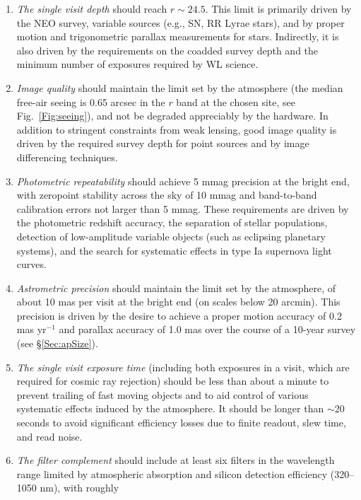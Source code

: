 \documentclass{emulateapj}
\begin{document}
\begin{enumerate}
\item  {\it The single visit depth} should reach $r\sim24.5$. This limit is
   primarily driven by the NEO survey, variable sources (e.g., SN,
   RR Lyrae stars), and by proper motion and trigonometric parallax 
   measurements for stars. Indirectly, it is also driven by the
   requirements on the coadded survey depth and the minimum number of 
   exposures required by WL science. 
\item  {\it Image quality} should maintain the limit set by the 
     atmosphere (the median free-air seeing is 0.65 arcsec in the $r$ band 
     at the chosen site, see Fig.~\ref{Fig:seeing}),
     and not be degraded appreciably by the hardware. In addition to stringent 
     constraints from weak lensing, good image quality is driven by the 
     required survey depth for point sources and by image differencing
     techniques. 
\item  {\it Photometric repeatability} should achieve 5 mmag precision
     at the bright end, with zeropoint stability across the sky of 10 mmag
     and band-to-band calibration errors not larger than 5 mmag.
     These requirements are driven by the photometric redshift accuracy,
     the separation of stellar populations, detection of low-amplitude variable
     objects (such as eclipsing planetary systems), and the search for
     systematic effects in type Ia supernova light curves.
\item  {\it Astrometric precision} should maintain the limit set by 
     the atmosphere, of about 10 mas per visit at the bright end
     (on scales below 20 arcmin). This precision is driven by the desire to 
     achieve a proper motion accuracy of 0.2 mas yr$^{-1}$ and parallax accuracy of 
     1.0 mas over the course of a 10-year survey (see \S \ref{Sec:apSize}).
\item  {\it The single visit exposure time} (including both exposures in a 
    visit, which are required for cosmic ray rejection) should be less than about a minute 
    to prevent trailing of fast moving objects and to aid control 
    of various systematic effects induced by the atmosphere. It should
    be longer than $\sim$20 seconds to avoid significant efficiency losses due to
    finite readout, slew time, and read noise.
\item  {\it The filter complement} should include at least six filters
    in the wavelength range limited by atmospheric absorption and 
    silicon detection efficiency (320--1050 nm), with roughly

\end{enumerate}
\end{document}
